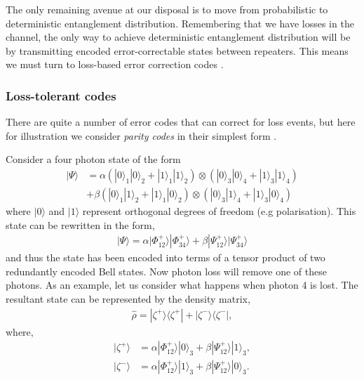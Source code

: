 The only remaining avenue at our disposal is to move from probabilistic to deterministic entanglement distribution. Remembering that we have losses in the channel, the only way to achieve deterministic entanglement distribution will be by transmitting encoded error-correctable states between repeaters. This means we must turn to loss-based error correction codes \cite{bib:ralph05, bib:munro12, bib:Fowler10, bib:ATL13, bib:MKLLJ14}.  

\subsubsection{Loss-tolerant codes}

There are quite a number of error codes that can correct for loss events, but here for illustration we consider \textit{parity codes} in their simplest form \cite{bib:ralph05, bib:munro12}. 

Consider a four photon state of the form
\begin{align}
|\Psi\rangle &= \alpha \left(|0\rangle_1 |0\rangle_2+|1\rangle_1 |1\rangle_2\right) \otimes \left(|0\rangle_3 |0\rangle_4+|1\rangle_3 |1\rangle_4\right) \nonumber \\
&+ \beta \left(|0\rangle_1 |1\rangle_2+|1\rangle_1 |0\rangle_2\right) \otimes \left(|0\rangle_3 |1\rangle_4+|1\rangle_3 |0\rangle_4\right)
\end{align}
where $|0\rangle$ and $|1\rangle$ represent orthogonal degrees of freedom (e.g polarisation). This state can be rewritten in the form,
\begin{align}\label{eq:third_gen_red_enc}
|\Psi\rangle = \alpha |\Phi_{12}^+\rangle  |\Phi_{34}^+\rangle+\beta |\Psi_{12}^+\rangle  |\Psi_{34}^+\rangle
\end{align}
and thus the state has been encoded into terms of a tensor product of two redundantly encoded Bell states. Now photon loss will remove one of these photons. As an example, let us consider what happens when photon 4 is lost. The resultant state can be represented by the density matrix,
\begin{align}
	\hat\rho= |\zeta^+\rangle \langle \zeta^+| +|\zeta^-\rangle \langle \zeta^-|,
	\end{align}
where,
\begin{align}
|\zeta^+\rangle &=  \alpha |\Phi_{12}^+\rangle |0\rangle_3 + \beta  |\Psi_{12}^+\rangle |1\rangle_3, \nonumber \\
|\zeta^-\rangle &=  \alpha |\Phi_{12}^+\rangle |1\rangle_3 + \beta  |\Psi_{12}^+\rangle |0\rangle_3.
\end{align}

